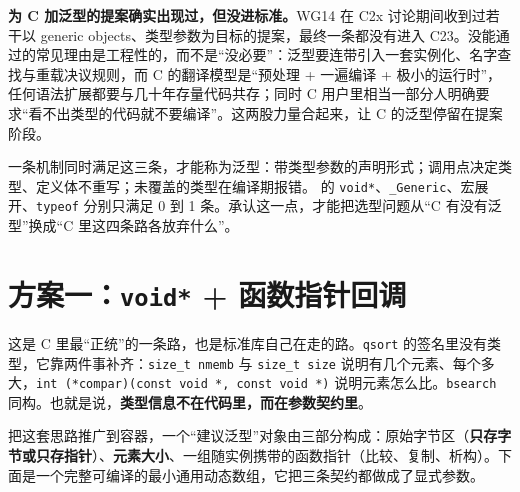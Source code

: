 \documentclass[12pt,a4paper,fontset=fandol]{ctexbook}
\newcommand{\clabel}{%
  \tcbox[on line,colback=cheadbg,colframe=cheadbg,
    boxrule=0pt,arc=1pt,left=2pt,right=2pt,top=1pt,bottom=1pt,
    colupper=white,fontupper=\scriptsize\bfseries]{C}}
\newcommand{\kw}[1]{\texttt{#1}}
\begin{document}
\textbf{为 C 加泛型的提案确实出现过，但没进标准。}WG14 在 C2x 讨论期间收到过若干以 generic objects、类型参数为目标的提案，最终一条都没有进入 C23。没能通过的常见理由是工程性的，而不是“没必要”：泛型要连带引入一套实例化、名字查找与重载决议规则，而 C 的翻译模型是“预处理 + 一遍编译 + 极小的运行时”，任何语法扩展都要与几十年存量代码共存；同时 C 用户里相当一部分人明确要求“看不出类型的代码就不要编译”。这两股力量合起来，让 C 的泛型停留在提案阶段。

\begin{guideline}[title={判断“算不算泛型”的三条判据}]
一条机制同时满足这三条，才能称为泛型：带类型参数的声明形式；调用点决定类型、定义体不重写；未覆盖的类型在编译期报错。\clabel{} 的 \kw{void*}、\kw{\_Generic}、宏展开、\kw{typeof} 分别只满足 0 到 1 条。承认这一点，才能把选型问题从“C 有没有泛型”换成“C 里这四条路各放弃什么”。
\end{guideline}

\section{方案一：\kw{void*} + 函数指针回调}

这是 C 里最“正统”的一条路，也是标准库自己在走的路。\kw{qsort} 的签名里没有类型，它靠两件事补齐：\kw{size\_t nmemb} 与 \kw{size\_t size} 说明有几个元素、每个多大，\kw{int (*compar)(const void *, const void *)} 说明元素怎么比。\kw{bsearch} 同构。也就是说，\textbf{类型信息不在代码里，而在参数契约里}。

把这套思路推广到容器，一个“建议泛型”对象由三部分构成：原始字节区（\textbf{只存字节或只存指针}）、\textbf{元素大小}、一组随实例携带的函数指针（比较、复制、析构）。下面是一个完整可编译的最小通用动态数组，它把三条契约都做成了显式参数。
\end{document}
